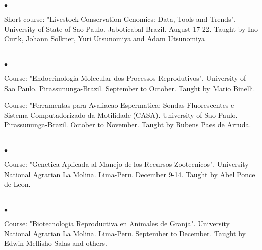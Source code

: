 \documentclass[margin,line,10pt]{res}
\newenvironment{list2}{
  \begin{list}{$\bullet$}{%
      \setlength{\itemsep}{0in}
      \setlength{\parsep}{0in} \setlength{\parskip}{0in}
      \setlength{\topsep}{0in} \setlength{\partopsep}{0in} 
      \setlength{\leftmargin}{0.2in}}}{\end{list}}
\begin{document}
\begin{resume}
\begin{list2}
  \item Short course: "Livestock Conservation Genomics: Data, Tools and Trends". University of State of Sao Paulo. Jaboticabal-Brazil. August 17-22. Taught by Ino Curik, Johann Solkner, Yuri Utsunomiya and Adam Utsunomiya
  \vspace{0.5cm}
\end{list2}  
\vspace{0.5cm}

\section{}

\begin{list2}
\item Course: "Endocrinologia Molecular dos Processos Reprodutivos". University of Sao Paulo. Pirassununga-Brazil. September to October.
Taught by Mario Binelli.
\vspace{0.5cm}
\item Course: "Ferramentas para Avaliacao Espermatica: Sondas Fluorescentes e Sistema Computadorizado da Motilidade (CASA). University of Sao Paulo. Pirassununga-Brazil. October to November.
Taught by Rubens Paes de Arruda.
\end{list2}  
\vspace{0.5cm}

\section{}

\begin{list2}
\item Course: "Genetica Aplicada al Manejo de los Recursos Zootecnicos". University National Agrarian La Molina. Lima-Peru. December 9-14.
Taught by Abel Ponce de Leon.
\end{list2}  
\vspace{0.5cm}

\section{}

\begin{list2}
\item Course: "Biotecnologia Reproductiva en Animales de Granja". University National Agrarian La Molina. Lima-Peru. September to December.
Taught by Edwin Mellisho Salas and others.
\end{list2}  
\vspace{0.5cm}


\end{resume}
\end{document}
